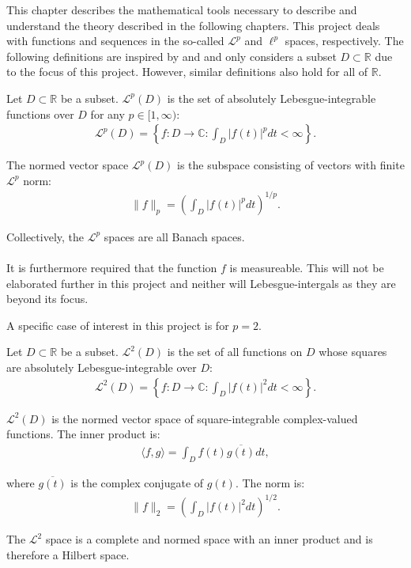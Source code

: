 This chapter describes the mathematical tools necessary to describe and understand the theory described in the following chapters. This project deals with functions and sequences in the so-called $\mathcal{L}^p$ and $\ell^p$ spaces, respectively. The following definitions are inspired by \cite{chapter 5-6, FSE2010} and \cite{chapter 2, FSP} and only considers a subset $D \subset \mathbb{R}$ due to the focus of this project. However, similar definitions also hold for all of $\mathbb{R}$.

\begin{definition} \label{def:Lpspace}
Let $D \subset \mathbb{R}$ be a subset. $\mathcal{L}^p(D)$ is the set of absolutely Lebesgue-integrable functions over $D$ for any $p \in [1,\infty)$:
\begin{align*}
\mathcal{L}^p(D) = \left\{ f: D \to \mathbb{C}: \int_D |f(t)|^p dt < \infty \right\}.
\end{align*}

The normed vector space $\mathcal{L}^p(D)$ is the subspace consisting of vectors with finite $\mathcal{L}^p$ norm:
\begin{align*}
\|f\|_p = \left( \int_D |f(t)|^p dt \right)^{1/p}.
\end{align*}

Collectively, the $\mathcal{L}^p$ spaces are all Banach spaces.
\\ \\
It is furthermore required that the function $f$ is measureable. This will not be elaborated further in this project and neither will Lebesgue-intergals as they are beyond its focus.
\end{definition}

A specific case of interest in this project is for $p = 2$.

\begin{definition} \label{def:L2space}
Let $D \subset \mathbb{R}$ be a subset. $\mathcal{L}^2(D)$ is the set of all functions on $D$ whose squares are absolutely Lebesgue-integrable over $D$:
\begin{align*}
\mathcal{L}^2(D) = \left\{ f: D \to \mathbb{C}: \int_D |f(t)|^2 dt < \infty \right\}.
\end{align*}

$\mathcal{L}^2(D)$ is the normed vector space of square-integrable complex-valued functions. The inner product is:
\begin{align*}
\langle f,g \rangle =  \int_D f(t) \overline{g(t)} dt,
\end{align*}

where $\overline{g(t)}$ is the complex conjugate of $g(t)$. The norm is:
\begin{align*}
\|f\|_2 = \left( \int_D |f(t)|^2 dt \right)^{1/2}.
\end{align*}

The $\mathcal{L}^2$ space is a complete and normed space with an inner product and is therefore a Hilbert space.

\end{definition}

